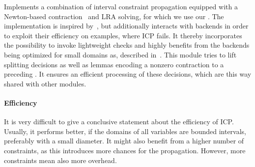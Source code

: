 Implements a combination of interval constraint propagation equipped with a Newton-based contraction~\cite{} and LRA solving, for which we use our \lraModuleClass. The implementation is inspired by~\cite{GGIGSC10}, but additionally interacts with backends in order to exploit their efficiency on examples, where ICP fails. It thereby incorporates the possibility to invoke lightweight checks and highly benefits from the backends being optimized for small domains as,  \eg described in~\cite{Article_Loup_TubeCAD}. This module tries to lift splitting decisions as well as lemmas encoding a nonzero contraction to a preceding \satModuleClass. It ensures an efficient processing of these decisions, which are this way shared with other modules.

\paragraph{Efficiency} It is very difficult to give a conclusive statement about the efficiency of ICP. Usually, it performs better, if the domains of all variables are bounded intervals, preferably with a small diameter. It might also benefit from a higher number of constraints, as this introduces more chances for the propagation. However, more constraints mean also more overhead.